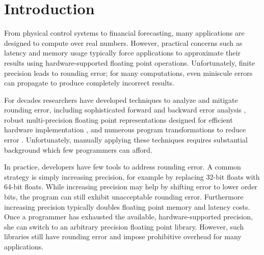 \documentclass[paper.tex]{subfiles}
\begin{document}
\section{Introduction}
\label{sec:intro}

From physical control systems to financial forecasting, many
applications are designed to compute over real numbers.  However,
practical concerns such as latency and memory usage typically force
applications to approximate their results using hardware-supported
floating point operations.  Unfortunately, finite precision leads to
rounding error; for many computations, even miniscule errors can
propagate to produce completely incorrect results.


For decades researchers have developed techniques to analyze and
mitigate rounding error, including sophisticated forward and backward
error analysis , robust multi-precision floating point
representations designed for efficient hardware implementation
, and numerous program transformations to reduce error
.  Unfortunately, manually applying these techniques
requires substantial background which few programmers can afford.

In practice, developers have few tools to address rounding error.  A
common strategy is simply increasing precision, for example by
replacing 32-bit floats with 64-bit floats.  While increasing
precision may help by shifting error to lower order bits, the program
can still exhibit unacceptable rounding error.  Furthermore increasing
precision typically doubles floating point memory and latency costs.
Once a programmer has exhausted the available, hardware-supported
precision, she can switch to an arbitrary precision floating point
library.  However, such libraries still have rounding error and impose
prohibitive overhead for many applications.  

\end{document}
